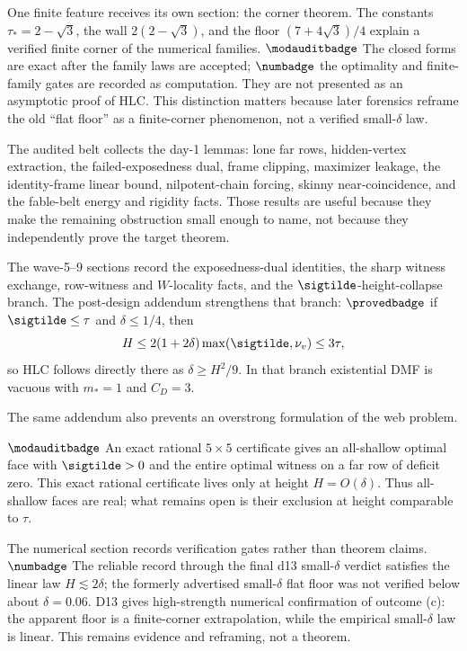 One finite feature receives its own section: the corner theorem.  The constants
\(\tau_*=2-\sqrt 3\), the wall \(2(2-\sqrt 3)\), and the floor
\((7+4\sqrt 3)/4\) explain a verified finite corner of the numerical
families.  \(\modauditbadge\) The closed forms are exact after the family laws
are accepted; \(\numbadge\) the optimality and finite-family gates are recorded
as computation.  They are not presented as an asymptotic proof of HLC.  This
distinction matters because later forensics reframe the old ``flat floor'' as
a finite-corner phenomenon, not a verified small-\(\delta\) law.

The audited belt collects the day-1 lemmas: lone far rows, hidden-vertex
extraction, the failed-exposedness dual, frame clipping, maximizer leakage,
the identity-frame linear bound, nilpotent-chain forcing, skinny
near-coincidence, and the fable-belt energy and rigidity facts.  Those results
are useful because they make the remaining obstruction small enough to name,
not because they independently prove the target theorem.

The wave-5--9 sections record the exposedness-dual identities, the sharp
witness exchange, row-witness and \(W\)-locality facts, and the
\(\sigtilde\)-height-collapse branch.  The post-design addendum strengthens
that branch: \(\provedbadge\) if \(\sigtilde\leq\tau\) and
\(\delta\leq1/4\), then
\[
  H\leq 2(1+2\delta)\max(\sigtilde,\nu_v)\leq 3\tau,
\]
so HLC follows directly there as \(\delta\geq H^2/9\).  In that branch
existential DMF is vacuous with \(m_*=1\) and \(C_D=3\).

The same addendum also prevents an overstrong formulation of the web problem.

\noindent\(\modauditbadge\) An exact rational \(5\times5\) certificate gives
an all-shallow optimal face with \(\sigtilde>0\) and the entire optimal witness
on a far row of deficit zero.  This exact rational certificate lives only at
height \(H=O(\delta)\).  Thus all-shallow faces are real; what remains open is
their exclusion at height comparable to \(\tau\).

The numerical section records verification gates rather than theorem claims.
\(\numbadge\) The reliable record through the final d13 small-\(\delta\)
verdict satisfies the linear law \(H\lesssim2\delta\); the formerly advertised
small-\(\delta\) flat floor was not verified below about \(\delta=0.06\).
D13 gives high-strength numerical confirmation of outcome (c): the apparent
floor is a finite-corner extrapolation, while the empirical small-\(\delta\)
law is linear.  This remains evidence and reframing, not a theorem.

